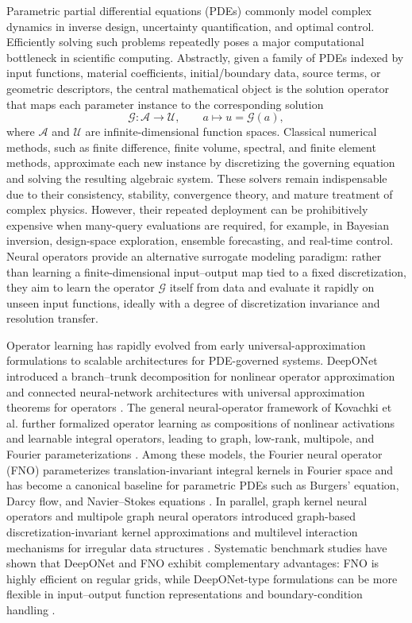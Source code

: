 \documentclass{article}
\begin{document}
Parametric partial differential equations (PDEs) commonly model complex dynamics in inverse design, uncertainty quantification, and optimal control. Efficiently solving such problems repeatedly poses a major computational bottleneck in scientific computing. Abstractly, given a family of PDEs indexed by input functions, material coefficients, initial/boundary data, source terms, or geometric descriptors, the central mathematical object is the solution operator that maps each parameter instance to the corresponding solution
\begin{equation}
    \mathcal{G}: \mathcal{A} \to \mathcal{U}, \qquad a \mapsto u=\mathcal{G}(a),
\end{equation}
where $\mathcal{A}$ and $\mathcal{U}$ are infinite-dimensional function spaces. Classical numerical methods, such as finite difference, finite volume, spectral, and finite element methods, approximate each new instance by discretizing the governing equation and solving the resulting algebraic system. These solvers remain indispensable due to their consistency, stability, convergence theory, and mature treatment of complex physics. However, their repeated deployment can be prohibitively expensive when many-query evaluations are required, for example, in Bayesian inversion, design-space exploration, ensemble forecasting, and real-time control. Neural operators provide an alternative surrogate modeling paradigm: rather than learning a finite-dimensional input--output map tied to a fixed discretization, they aim to learn the operator $\mathcal{G}$ itself from data and evaluate it rapidly on unseen input functions, ideally with a degree of discretization invariance and resolution transfer.

Operator learning has rapidly evolved from early universal-approximation formulations to scalable architectures for PDE-governed systems. DeepONet introduced a branch--trunk decomposition for nonlinear operator approximation and connected neural-network architectures with universal approximation theorems for operators \cite{chen1995,lu2021deeponet}. The general neural-operator framework of Kovachki et al. further formalized operator learning as compositions of nonlinear activations and learnable integral operators, leading to graph, low-rank, multipole, and Fourier parameterizations \cite{kovachki2023neuraloperator}. Among these models, the Fourier neural operator (FNO) parameterizes translation-invariant integral kernels in Fourier space and has become a canonical baseline for parametric PDEs such as Burgers' equation, Darcy flow, and Navier--Stokes equations \cite{li2021fno}. In parallel, graph kernel neural operators and multipole graph neural operators introduced graph-based discretization-invariant kernel approximations and multilevel interaction mechanisms for irregular data structures \cite{li2020gno,li2020multipole}. Systematic benchmark studies have shown that DeepONet and FNO exhibit complementary advantages: FNO is highly efficient on regular grids, while DeepONet-type formulations can be more flexible in input--output function representations and boundary-condition handling \cite{lu2022comprehensive}. 
\end{document}
